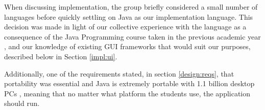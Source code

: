 When discussing implementation, the group briefly considered a small
number of languages before quickly settling on Java as our 
implementation language. This decision was made in light of our 
collective experience with the language as a consequence of the Java 
Programming course taken in the previous academic year
\cite{javaProgramming2}, and our knowledge of existing GUI frameworks 
that would suit our purposes, described below in Section \ref{impl:ui}.

Additionally, one of the requirements stated, in section
\ref{design:reqs}, that portability was essential and Java is
extremely portable with 1.1 billion desktop PCs \cite{aboutJava},
meaning that no matter what platform the students use, the application
should run.

